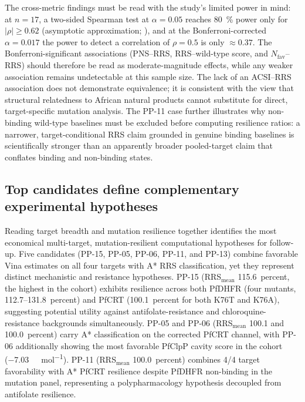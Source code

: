\documentclass[journal=jcisd8,manuscript=article]{achemso}
\begin{document}
The cross-metric findings must be read with the study's limited power in mind: at $n=\num{17}$, a two-sided Spearman test at $\alpha=\num{0.05}$ reaches \qty{80}{\percent} power only for $|\rho|\geq\num{0.62}$ (asymptotic approximation; ), and at the Bonferroni-corrected $\alpha=\num{0.017}$ the power to detect a correlation of $\rho=\num{0.5}$ is only $\approx\num{0.37}$. The Bonferroni-significant associations (PNS--RRS, RRS--wild-type score, and $N_{\mathrm{fav}}$--RRS) should therefore be read as moderate-magnitude effects, while any weaker association remains undetectable at this sample size. The lack of an ACSI--RRS association does not demonstrate equivalence; it is consistent with the view that structural relatedness to African natural products cannot substitute for direct, target-specific mutation analysis. The PP-11 case further illustrates why non-binding wild-type baselines must be excluded before computing resilience ratios: a narrower, target-conditional RRS claim grounded in genuine binding baselines is scientifically stronger than an apparently broader pooled-target claim that conflates binding and non-binding states.

\subsection{Top candidates define complementary experimental hypotheses}\label{sec:disc_top}
Reading target breadth and mutation resilience together identifies the most economical multi-target, mutation-resilient computational hypotheses for follow-up. Five candidates (PP-15, PP-05, PP-06, PP-11, and PP-13) combine favorable Vina estimates on all four targets with A* RRS classification, yet they represent distinct mechanistic and resistance hypotheses. PP-15 (RRS$_{\mathrm{mean}}$ \num{115.6}~percent, the highest in the cohort) exhibits resilience across both PfDHFR (four mutants, \numrange{112.7}{131.8}~percent) and PfCRT (\num{100.1}~percent for both K76T and K76A), suggesting potential utility against antifolate-resistance and chloroquine-resistance backgrounds simultaneously. PP-05 and PP-06 (RRS$_{\mathrm{mean}}$ \num{100.1} and \num{100.0}~percent) carry A* classification on the corrected PfCRT channel, with PP-06 additionally showing the most favorable PfClpP cavity score in the cohort (\num{-7.03}~\si{\kilo\calorie\per\mole}). PP-11 (RRS$_{\mathrm{mean}}$ \num{100.0}~percent) combines 4/4 target favorability with A* PfCRT resilience despite PfDHFR non-binding in the mutation panel, representing a polypharmacology hypothesis decoupled from antifolate resilience.
\end{document}
